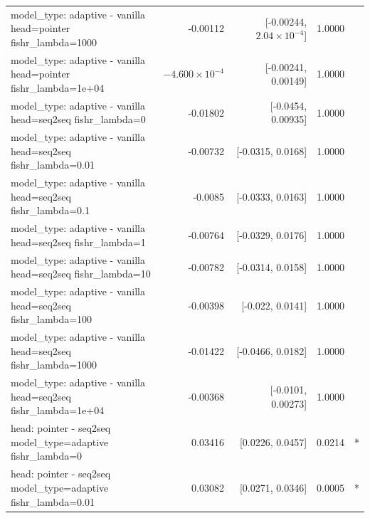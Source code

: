\documentclass[10pt]{article}
\makeatletter
\newcommand{\stackcell}[1]{\begin{tabular}[t]{@{}l@{}}#1\end{tabular}}
\makeatother
\begin{document}
{\begin{longtable}{lrrrl}
\stackcell{model\_type: adaptive - vanilla\\\footnotesize head=pointer fishr\_lambda=1000 } & -0.00112 & [-0.00244, $2.04\times10^{-4}$] & 1.0000 & \\
\stackcell{model\_type: adaptive - vanilla\\\footnotesize head=pointer fishr\_lambda=1e+04 } & $-4.600\times10^{-4}$ & [-0.00241, 0.00149] & 1.0000 & \\
\stackcell{model\_type: adaptive - vanilla\\\footnotesize head=seq2seq fishr\_lambda=0 } & -0.01802 & [-0.0454, 0.00935] & 1.0000 & \\
\stackcell{model\_type: adaptive - vanilla\\\footnotesize head=seq2seq fishr\_lambda=0.01 } & -0.00732 & [-0.0315, 0.0168] & 1.0000 & \\
\stackcell{model\_type: adaptive - vanilla\\\footnotesize head=seq2seq fishr\_lambda=0.1 } & -0.0085 & [-0.0333, 0.0163] & 1.0000 & \\
\stackcell{model\_type: adaptive - vanilla\\\footnotesize head=seq2seq fishr\_lambda=1 } & -0.00764 & [-0.0329, 0.0176] & 1.0000 & \\
\stackcell{model\_type: adaptive - vanilla\\\footnotesize head=seq2seq fishr\_lambda=10 } & -0.00782 & [-0.0314, 0.0158] & 1.0000 & \\
\stackcell{model\_type: adaptive - vanilla\\\footnotesize head=seq2seq fishr\_lambda=100 } & -0.00398 & [-0.022, 0.0141] & 1.0000 & \\
\stackcell{model\_type: adaptive - vanilla\\\footnotesize head=seq2seq fishr\_lambda=1000 } & -0.01422 & [-0.0466, 0.0182] & 1.0000 & \\
\stackcell{model\_type: adaptive - vanilla\\\footnotesize head=seq2seq fishr\_lambda=1e+04 } & -0.00368 & [-0.0101, 0.00273] & 1.0000 & \\
\stackcell{head: pointer - seq2seq\\\footnotesize model\_type=adaptive fishr\_lambda=0 } & 0.03416 & [0.0226, 0.0457] & 0.0214 & *\\
\stackcell{head: pointer - seq2seq\\\footnotesize model\_type=adaptive fishr\_lambda=0.01 } & 0.03082 & [0.0271, 0.0346] & 0.0005 & *\\

\end{longtable}}
\end{document}
